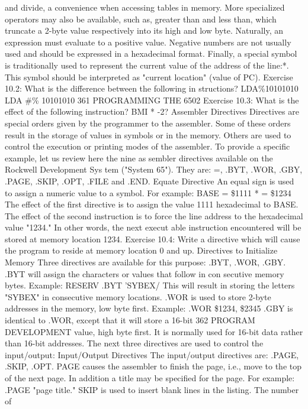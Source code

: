 \documentclass{book}
\begin{document}
{{{{{{{{{{{{{{{{{{{{{{{{{{{{{{{{{{{{{{{{{{{{{{{{{{{{{{{{{{{{{{{{{{{{{{{{{{{{{{{{{{{{{{{{{{{{{{{{{{{{{{{{{{{{{{{{{{{{{{{{{{{{{{{{{{{{{{{{{{{{and divide, a convenience when accessing tables in memory. More
specialized operators may also be available, such as, greater
than and less than, which truncate a 2-byte value respectively
into its high and low byte.
Naturally, an expression must evaluate to a positive value.
Negative numbers are not usually used and should be expressed in a
hexadecimal format.
Finally, a special symbol is traditionally used to represent the
current value of the address of the line:*. This symbol should be
interpreted as "current location" (value of PC).
Exercise 10.2: What is the difference between the following in
structions?
LDA\%10101010
LDA #\% 10101010
361
PROGRAMMING THE 6502
Exercise 10.3: What is the effect of the following instruction?
BMI * -2?
Assembler Directives
Directives are special orders given by the programmer to the
assembler. Some of these orders result in the storage of values in
symbols or in the memory. Others are used to control the execution
or printing modes of the assembler.
To provide a specific example, let us review here the nine as
sembler directives available on the Rockwell Development Sys
tem ("System 65"). They are: =, .BYT, .WOR, .GBY, .PAGE,
.SKIP, .OPT, .FILE and .END.
Equate Directive
An equal sign is used to assign a numeric value to a symbol. For
example:
BASE = \$1111
* = \$1234
The effect of the first directive is to assign the value 1111
hexadecimal to BASE.
The effect of the second instruction is to force the line address to
the hexadecimal value "1234." In other words, the next execut
able instruction encountered will be stored at memory location
1234.
Exercise 10.4: Write a directive which will cause the program to
reside at memory location 0 and up.
Directives to Initialize Memory
Three directives are available for this purpose: .BYT, .WOR, .GBY.
.BYT will assign the characters or values that follow in con
secutive memory bytes.
Example: RESERV .BYT 'SYBEX/
This will result in storing the letters "SYBEX" in consecutive
memory locations.
.WOR is used to store 2-byte addresses in the memory, low byte
first.
Example: .WOR \$1234, \$2345
.GBY is identical to .WOR, except that it will store a 16-bit
362
PROGRAM DEVELOPMENT
value, high byte first. It is normally used for 16-bit data rather
than 16-bit addresses.
The next three directives are used to control the input/output:
Input/Output Directives
The input/output directives are: .PAGE, .SKIP, .OPT.
PAGE causes the assembler to finish the page, i.e., move to the
top of the next page. In addition a title may be specified for the
page. For example: .PAGE "page title."
SKIP is used to insert blank lines in the listing. The number of
}}}}}}}}}}}}}}}}}}}}}}}}}}}}}}}}}}}}}}}}}}}}}}}}}}}}}}}}}}}}}}}}}}}}}}}}}}}}}}}}}}}}}}}}}}}}}}}}}}}}}}}}}}}}}}}}}}}}}}}}}}}}}}}}}}}}}}}}}}}}
\end{document}
